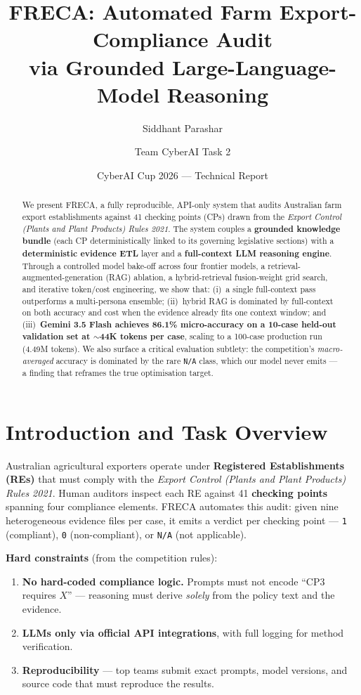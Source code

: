 \documentclass[11pt,a4paper]{article}
\title{\bfseries FRECA: Automated Farm Export-Compliance Audit\\ via Grounded Large-Language-Model Reasoning}
\author{Siddhant Parashar \and Team CyberAI Task 2}
\date{CyberAI Cup 2026 --- Technical Report}
\begin{document}
\maketitle

\begin{abstract}
We present \textsc{FRECA}, a fully reproducible, API-only system that audits Australian farm export establishments against 41 checking points (CPs) drawn from the \emph{Export Control (Plants and Plant Products) Rules 2021}. The system couples a \textbf{grounded knowledge bundle} (each CP deterministically linked to its governing legislative sections) with a \textbf{deterministic evidence ETL} layer and a \textbf{full-context LLM reasoning engine}. Through a controlled model bake-off across four frontier models, a retrieval-augmented-generation (RAG) ablation, a hybrid-retrieval fusion-weight grid search, and iterative token/cost engineering, we show that: (i)~a single full-context pass outperforms a multi-persona ensemble; (ii)~hybrid RAG is dominated by full-context on both accuracy and cost when the evidence already fits one context window; and (iii)~\textbf{Gemini 3.5 Flash achieves 86.1\% micro-accuracy on a 10-case held-out validation set at $\sim$44K tokens per case}, scaling to a 100-case production run (4.49M tokens). We also surface a critical evaluation subtlety: the competition's \emph{macro-averaged} accuracy is dominated by the rare \texttt{N/A} class, which our model never emits --- a finding that reframes the true optimisation target.
\end{abstract}

\section{Introduction and Task Overview}
Australian agricultural exporters operate under \textbf{Registered Establishments (REs)} that must comply with the \emph{Export Control (Plants and Plant Products) Rules 2021}. Human auditors inspect each RE against 41 \textbf{checking points} spanning four compliance elements. FRECA automates this audit: given nine heterogeneous evidence files per case, it emits a verdict per checking point --- \texttt{1} (compliant), \texttt{0} (non-compliant), or \texttt{N/A} (not applicable).

\textbf{Hard constraints} (from the competition rules):
\begin{enumerate}[leftmargin=*,itemsep=1pt]
  \item \textbf{No hard-coded compliance logic.} Prompts must not encode ``CP3 requires $X$'' --- reasoning must derive \emph{solely} from the policy text and the evidence.
  \item \textbf{LLMs only via official API integrations}, with full logging for method verification.
  \item \textbf{Reproducibility} --- top teams submit exact prompts, model versions, and source code that must reproduce the results.
\end{enumerate}
\end{document}
